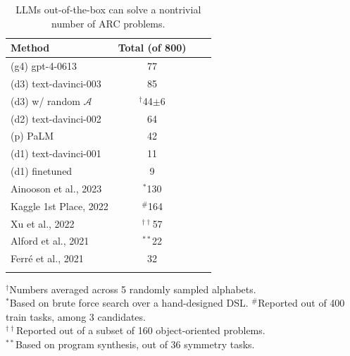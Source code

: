 \begin{table}
    \vspace{-1.3em}
    \small
    \setlength\tabcolsep{3.5pt}
    \centering
    \begin{tabular}{@{}lccc@{}}
    \toprule
    Method & Total (of 800) \\
    \midrule
    (g4) gpt-4-0613 & 77 \\
    (d3) text-davinci-003 & 85 \\
    (d3) w/ random $\mathcal{A}$ & $^\dagger$44$\pm$6 \\  %
    (d2) text-davinci-002 \cite{ouyang2022training} & 64 \\
    (p) PaLM \cite{chowdhery2022palm,anil2023palm} & 42 \\
    (d1) text-davinci-001 \cite{brown2020language} & 11 \\
    (d1) finetuned & 9 \\
    \midrule
    Ainooson et al., 2023 \cite{ainooson2023approach}  & $^{*}$130 \\
    Kaggle 1st Place, 2022 \cite{kaggle} & $^\#$164 \\
    Xu et al., 2022 \cite{xu2022graphs} & $^{\dagger\dagger}$57  \\
    Alford et al., 2021 \cite{alford2021neurosymbolic} & $^{**}$22 \\
    Ferré et al., 2021 \cite{ferre2021first} & 32 \\
    \bottomrule
    \vspace{-0.9em}
    \end{tabular}
    \scriptsize
    $^\dagger$Numbers averaged across 5 randomly sampled alphabets.\\
    $^{*}$Based on brute force search over a hand-designed DSL.
    $^\#$Reported out of 400 train tasks, among 3 candidates.\\
    $^{\dagger\dagger}$Reported out of a subset of 160 object-oriented problems.\\
    $^{**}$Based on program synthesis, out of 36 symmetry tasks.\\
    \vspace{-0.7em}
    \caption{
    \small
    LLMs out-of-the-box can solve a nontrivial number of ARC problems. 
    \vspace{-3em}
    }
    \label{tab:arc-results}
    \vspace{-1em}
\end{table}

